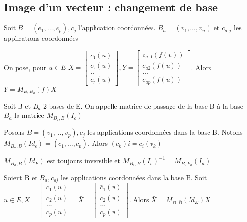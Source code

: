 \documentclass[french]{yLectureNote}
\begin{document}
\subsection{Image d'un vecteur : changement de base}
Soit \(B = (e_1,\dots,e_p), c_j\) l'application coordonnées. \(B_a = (v_1,\dots, v_n)\) et \(c_{a,j}\) les applications coordonnées
\begin{proposition}
On pose, pour \(u\in E\) \(X = \begin{bmatrix}c_1(u)\\c_2(u)\\\dots\\c_p(u)\end{bmatrix}, Y = \begin{bmatrix}c_{a,1}(f(u))\\c_{a2}(f(u))\\\dots\\c_{ap}(f(u))\end{bmatrix}\). Alors\(Y = M_{B,B_a}(f)X\)
\end{proposition}
\begin{definition}
Soit B et \(B_a\) 2 bases de E. On appelle matrice de passage de la base B à la base \(B_a\) la matrice \(M_{B_a,B}(I_d)\)
\end{definition}
\begin{proposition}
Posons \(B  = (v_1, \dots,v_p), c_j\) les applications coordonnées dans la base B. Notons \(M_{B_a,B}(Id_e) = (c_1,\dots, c_p)\). Alors \((c_k)i = c_i(v_k)\)
\end{proposition}
\begin{proposition}
\(M_{B_a,B}(Id_E)\) est toujours inversible et \(M_{B_a,B}(I_d)^{-1} = M_{B,B_a}(I_d)\)
\end{proposition}
\begin{proposition}
Soient B et \(B_a, c_{aj}\) les applications coordonnées dans la base B. Soit \(u \in E, X = \begin{bmatrix}c_1(u)\\c_2(u)\\\dots\\c_p(u)\end{bmatrix},  \bar{X} = \begin{bmatrix}\bar{c}_1(u)\\\bar{c}_2(u)\\\dots\\\bar{c}_p(u)\end{bmatrix}\). Alors \(\bar{X} = M_{B, \bar{B}}(Id_E)X\)
\end{proposition}
\end{document}
